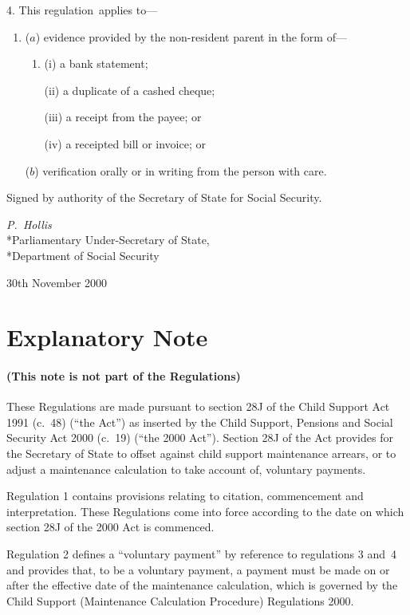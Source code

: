 \documentclass[12pt,a4paper]{article}
\begin{document}
4.  This regulation~applies to—
\begin{enumerate}\item[]
($a$) evidence provided by the non-resident parent in the form of—
\begin{enumerate}\item[]
(i) a bank statement;

(ii) a duplicate of a cashed cheque;

(iii) a receipt from the payee; or

(iv) a receipted bill or invoice; or
\end{enumerate}

($b$) verification orally or in writing from the person with care.
\end{enumerate}

\bigskip

Signed 
by authority of the Secretary of State for Social Security.

{\raggedleft
\emph{P.~Hollis}\\*Parliamentary Under-Secretary of State,\\*Department of Social Security

}

30th November 2000

\small

\part{Explanatory Note}

\renewcommand\parthead{--- Explanatory Note}

\subsection*{(This note is not part of the Regulations)}

These Regulations are made pursuant to section 28J of the Child Support Act 1991 (c.\ 48) (“the Act”) as inserted by the Child Support, Pensions and Social Security Act 2000 (c.\ 19) (“the 2000 Act”). Section 28J of the Act provides for the Secretary of State to offset against child support maintenance arrears, or to adjust a maintenance calculation to take account of, voluntary payments.

Regulation 1 contains provisions relating to citation, commencement and interpretation. These Regulations come into force according to the date on which section 28J of the 2000 Act is commenced.

Regulation 2 defines a “voluntary payment” by reference to regulations 3 and~4 and provides that, to be a voluntary payment, a payment must be made on or after the effective date of the maintenance calculation, which is governed by the Child Support (Maintenance Calculation Procedure) Regulations 2000.
\end{document}
